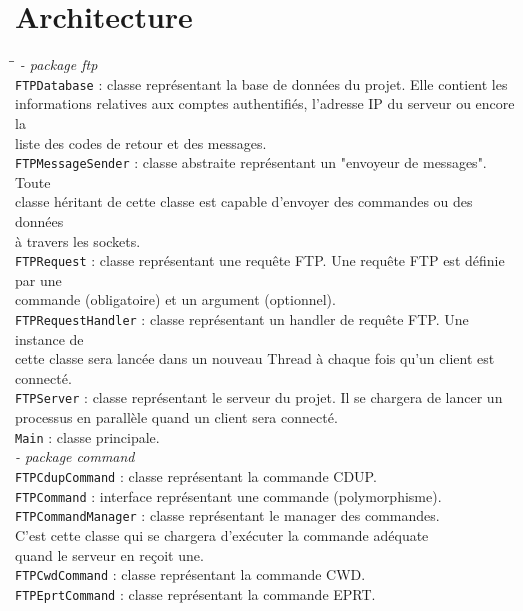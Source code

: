 \section*{Architecture}
\begin{tabbing}
	\hspace{1cm}\=\hspace{1cm}\=\kill
	\textit{- package ftp}\\
		\>\verb+FTPDatabase+ : classe représentant la base de données du projet. Elle contient les \\\>informations relatives aux comptes authentifiés, l'adresse IP du serveur ou encore la \\\>liste des codes de retour et des messages.\\
	\>\verb+FTPMessageSender+ : classe abstraite représentant un "envoyeur de messages". Toute \\\>classe héritant de cette classe est capable d'envoyer des commandes ou des données \\\>à travers les sockets.\\
	\>\verb+FTPRequest+ : classe représentant une requête FTP. Une requête FTP est définie par une \\\>commande (obligatoire) et un argument (optionnel).\\
	\>\verb+FTPRequestHandler+ : classe représentant un handler de requête FTP. Une instance de \\\>cette classe sera lancée dans un nouveau Thread à chaque fois qu'un client est connecté.\\
	\>\verb+FTPServer+ : classe représentant le serveur du projet. Il se chargera de lancer un processus en parallèle quand un client sera connecté.\\
	\>\verb+Main+ : classe principale.\\
		\>\textit{- package command}\\
			\>\>\verb+FTPCdupCommand+ : classe représentant la commande CDUP.\\
			\>\>\verb+FTPCommand+ : interface représentant une commande (polymorphisme).\\
			\>\>\verb+FTPCommandManager+ : classe représentant le manager des commandes. \\\>\>C'est cette classe qui se chargera d'exécuter la commande adéquate \\\>\>quand le serveur en reçoit une.\\
			\>\>\verb+FTPCwdCommand+ : classe représentant la commande CWD.\\
			\>\>\verb+FTPEprtCommand+ : classe représentant la commande EPRT.\\

\end{tabbing}
